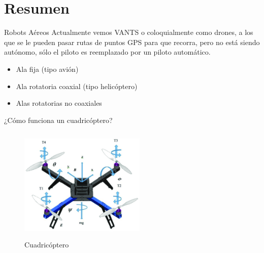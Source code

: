 \documentclass[
	11pt, %
]{beamer}
\begin{document}


\section{Resumen}

\begin{frame}{Robots A\'{e}reos}
  Actualmente vemos VANTS o coloquialmente como drones, a los que se le pueden pasar rutas de puntos GPS para que recorra, pero no est\'{a} siendo aut\'{o}nomo, sólo el piloto es reemplazado por un piloto autom\'{a}tico.\\
  \bigskip %
  \begin{itemize}
  \item Ala fija (tipo avi\'{o}n)
  \item Ala rotatoria coaxial (tipo helic\'{o}ptero)
  \item Alas rotatorias no coaxiales
  \end{itemize}
\end{frame}

\begin{frame}{¿C\'{o}mo funciona un cuadric\'{o}ptero?}
  \begin{figure}
    \centering
    \includegraphics[width=6cm, height=5.5cm]{fuerzas_drone}
    \caption[Caption for LOF]{Cuadric\'{o}ptero\protect\footnotemark}
  \end{figure}
\end{frame}
\end{document}

